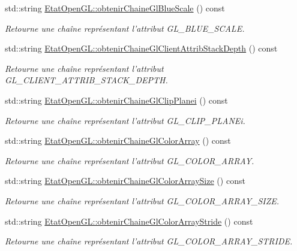 \begin{DoxyCompactItemize}
std\-::string \hyperlink{group__utilitaire_ga8422f585aba4fc07dcaac22e6cf587b3}{Etat\-Open\-G\-L\-::obtenir\-Chaine\-Gl\-Blue\-Scale} () const 
\begin{DoxyCompactList}\small\item\em Retourne une chaîne représentant l'attribut G\-L\-\_\-\-B\-L\-U\-E\-\_\-\-S\-C\-A\-L\-E. \end{DoxyCompactList}\item 
std\-::string \hyperlink{group__utilitaire_gad57f6d8da9cffeae2204a77e6e5f9292}{Etat\-Open\-G\-L\-::obtenir\-Chaine\-Gl\-Client\-Attrib\-Stack\-Depth} () const 
\begin{DoxyCompactList}\small\item\em Retourne une chaîne représentant l'attribut G\-L\-\_\-\-C\-L\-I\-E\-N\-T\-\_\-\-A\-T\-T\-R\-I\-B\-\_\-\-S\-T\-A\-C\-K\-\_\-\-D\-E\-P\-T\-H. \end{DoxyCompactList}\item 
std\-::string \hyperlink{group__utilitaire_ga7deb847efbc619585d5e8c9f6600204c}{Etat\-Open\-G\-L\-::obtenir\-Chaine\-Gl\-Clip\-Planei} () const 
\begin{DoxyCompactList}\small\item\em Retourne une chaîne représentant l'attribut G\-L\-\_\-\-C\-L\-I\-P\-\_\-\-P\-L\-A\-N\-Ei. \end{DoxyCompactList}\item 
std\-::string \hyperlink{group__utilitaire_ga8fae4f702f9be3574209f0721b6768ba}{Etat\-Open\-G\-L\-::obtenir\-Chaine\-Gl\-Color\-Array} () const 
\begin{DoxyCompactList}\small\item\em Retourne une chaîne représentant l'attribut G\-L\-\_\-\-C\-O\-L\-O\-R\-\_\-\-A\-R\-R\-A\-Y. \end{DoxyCompactList}\item 
std\-::string \hyperlink{group__utilitaire_gad1e82d8c71b8e2a76c806e1c92cbb669}{Etat\-Open\-G\-L\-::obtenir\-Chaine\-Gl\-Color\-Array\-Size} () const 
\begin{DoxyCompactList}\small\item\em Retourne une chaîne représentant l'attribut G\-L\-\_\-\-C\-O\-L\-O\-R\-\_\-\-A\-R\-R\-A\-Y\-\_\-\-S\-I\-Z\-E. \end{DoxyCompactList}\item 
std\-::string \hyperlink{group__utilitaire_gab499d52456b097364de8300cc6af6808}{Etat\-Open\-G\-L\-::obtenir\-Chaine\-Gl\-Color\-Array\-Stride} () const 
\begin{DoxyCompactList}\small\item\em Retourne une chaîne représentant l'attribut G\-L\-\_\-\-C\-O\-L\-O\-R\-\_\-\-A\-R\-R\-A\-Y\-\_\-\-S\-T\-R\-I\-D\-E. \end{DoxyCompactList}\item 

\end{DoxyCompactItemize}
